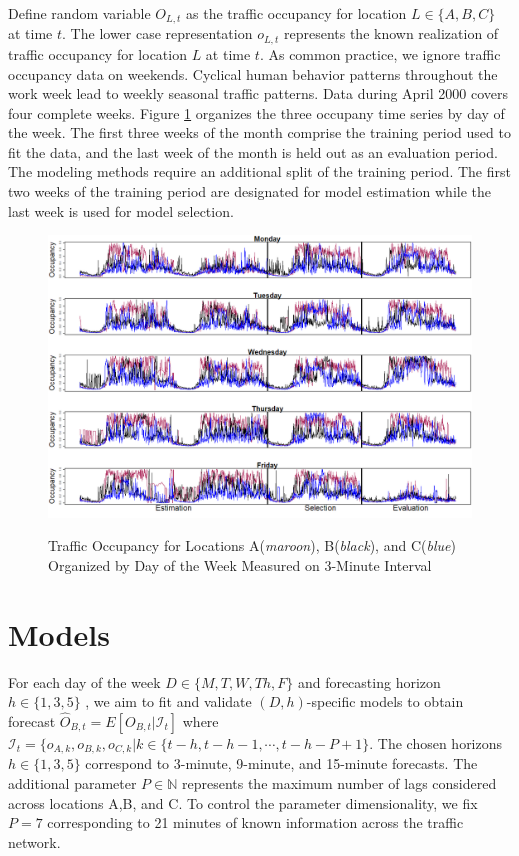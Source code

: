 Define random variable $O_{L,t}$ as the traffic occupancy for location $L \in\{A,B,C\}$ at time $t$. The lower case representation $o_{L,t}$ represents the known realization of traffic occupancy for location $L$ at time $t$. As common practice, we ignore traffic occupancy data on weekends. Cyclical human behavior patterns throughout the work week lead to weekly seasonal traffic patterns. Data during April 2000 covers four complete weeks. Figure \ref{fig:OrigPlotTrafficOcc} organizes the three occupany time series by day of the week. The first three weeks of the month comprise the training period used to fit the data, and the last week of the month is held out as an evaluation period. The modeling methods require an additional split of the training period. The first two weeks of the training period are designated for model estimation while the last week is used for model selection.

\begin{figure}[!h]
\caption{Traffic Occupancy for Locations A(\textit{maroon}), B(\textit{black}), and C(\textit{blue}) Organized by Day of the Week Measured on 3-Minute Interval }
\includegraphics[width=\textwidth]{OrigPlotTrafficOcc}
\label{fig:OrigPlotTrafficOcc}
\end{figure}







\section{Models}
\label{sec:models}
For each day of the week $D\in\{M,T,W,Th,F\}$ and forecasting horizon $h \in \{1,3,5\}$ , we aim to fit and validate $(D,h)$-specific models to obtain forecast $\widehat{O}_{B,t}=E[O_{B,t}|\mathcal{I}_t]$ where $\mathcal{I}_t=\{o_{A,k},o_{B,k},o_{C,k}|k\in\{t-h,t-h-1,\cdots,t-h-P+1\}$.  The chosen horizons  $h \in \{1,3,5\}$ correspond to 3-minute, 9-minute, and 15-minute forecasts. The additional parameter $P\in\mathbb{N}$ represents the maximum number of lags considered across locations A,B, and C. To control the parameter dimensionality, we fix $P=7$ corresponding to 21 minutes of known information across the traffic network. 

